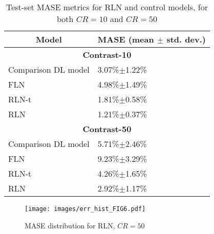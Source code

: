 \documentclass[3p, preprint]{elsarticle}
\begin{document}
\begin{table}
\centering
\begin{tabular}{|p{}|p{}|}\hline
\multicolumn{1}{|c|}{\normalsize \bf Model} & \multicolumn{1}{c|}{\normalsize \textbf{MASE} (mean $\pm$ std. dev.)}                          \\ \hline \hline
\multicolumn{2}{|c|}{ \bf Contrast-10}                               \\ \hline
Comparison DL model \cite{yang2019}      & 3.07\%$\pm$1.22\%     \\ \hline
FLN                                     & 4.98\%$\pm$1.49\%     \\ \hline
RLN-t                                   & 1.81\%$\pm$0.58\%     \\ \hline
RLN                                     & 1.21\%$\pm$0.37\%     \\ \hline \hline
\multicolumn{2}{|c|}{ \bf Contrast-50}                               \\ \hline
Comparison DL model                     & 5.71\%$\pm$2.46\%       \\ \hline
FLN                                     & 9.23\%$\pm$3.29\%       \\ \hline
RLN-t                                   & 4.26\%$\pm$1.65\%       \\ \hline
RLN                                     & 2.92\%$\pm$1.17\%       \\ \hline
\end{tabular}
\caption{Test-set MASE metrics for RLN and control models, for both $CR=10$ and $CR=50$}
\label{tab:res10}
\end{table}

\begin{figure}
    \centering
    \texttt{[image: images/err\_hist\_FIG6.pdf]}
    \caption{MASE distribution for RLN, $CR=50$}
    \label{fig:errhist}
\end{figure}
\end{document}
